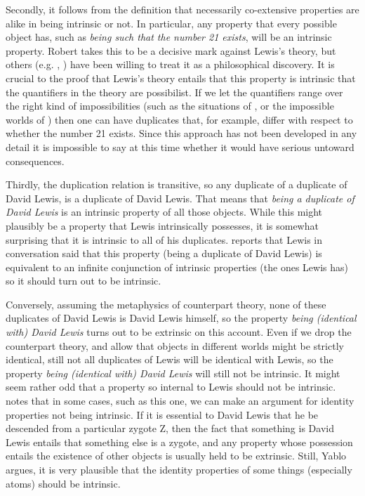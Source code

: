 Secondly, it follows from the definition that necessarily co-extensive properties are alike in being intrinsic or not. In particular, any property that every possible object has, such as \textit{being such that the number 21 exists}, will be an intrinsic property. Robert \citet{Francescotti1999} takes this to be a decisive mark against Lewis's theory, but others (e.g. \citet{Sider1993-SIDAAS}, \citet{Weatherson2001-WEAIPA}) have been willing to treat it as a philosophical discovery. It is crucial to the proof that Lewis's theory entails that this property is intrinsic that the quantifiers in the theory are possibilist. If we let the quantifiers range over the right kind of impossibilities (such as the situations of \citet{BarwisePerry1983}, or the impossible worlds of \citet{Nolan1998}) then one can have duplicates that, for example, differ with respect to whether the number 21 exists. Since this approach has not been developed in any detail it is impossible to say at this time whether it would have serious untoward consequences.

Thirdly, the duplication relation is transitive, so any duplicate of a duplicate of David Lewis, is a duplicate of David Lewis. That means that \textit{being a duplicate of David Lewis} is an intrinsic property of all those objects. While this might plausibly be a property that Lewis intrinsically possesses, it is somewhat surprising that it is intrinsic to all of his duplicates. \citet{Dunn1990} reports that Lewis in conversation said that this property (being a duplicate of David Lewis) is equivalent to an infinite conjunction of intrinsic properties (the ones Lewis has) so it should turn out to be intrinsic.

Conversely, assuming the metaphysics of counterpart theory, none of these duplicates of David Lewis is David Lewis himself, so the property \textit{being (identical with) David Lewis} turns out to be extrinsic on this account. Even if we drop the counterpart theory, and allow that objects in different worlds might be strictly identical, still not all duplicates of Lewis will be identical with Lewis, so the property \textit{being (identical with) David Lewis} will still not be intrinsic. It might seem rather odd that a property so internal to Lewis should not be intrinsic. \citet{Yablo1999} notes that in some cases, such as this one, we can make an argument for identity properties not being intrinsic. If it is essential to David Lewis that he be descended from a particular zygote Z, then the fact that something is David Lewis entails that something else is a zygote, and any property whose possession entails the existence of other objects is usually held to be extrinsic. Still, Yablo argues, it is very plausible that the identity properties of some things (especially atoms) should be intrinsic.

